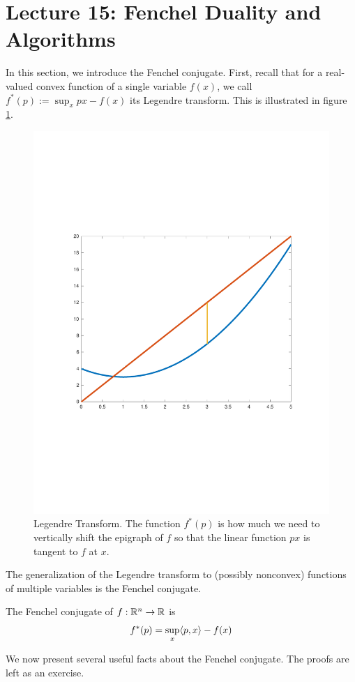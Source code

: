 \section{Lecture 15: Fenchel Duality and Algorithms}

In this section, we introduce the Fenchel conjugate. First, recall that for a real-valued convex function of a single variable $f(x)$, we call $f^*(p) := \sup_x px - f(x)$ its Legendre transform. This is illustrated in figure \ref{fig:leg-conj}.

\begin{figure}[h]
    \centering
    \includegraphics[width=.75\textwidth, trim = 0 200 0 200, clip]{figures/lecture15-conjugate.pdf}
    \caption{Legendre Transform. The function $f^*(p)$ is how much we need to vertically shift the epigraph of $f$ so that the linear function $px$ is tangent to $f$ at $x$.}
    \label{fig:leg-conj}
\end{figure}

The generalization of the Legendre transform to (possibly nonconvex) functions of multiple variables is the Fenchel conjugate.
\begin{definition}
The Fenchel conjugate of $f:\mathbb{R}^n \to \mathbb{R}$ is \[f^*(p) = \sup_x \langle p,x\rangle - f(x)\]
\end{definition}

We now present several useful facts about the Fenchel conjugate. The proofs are left as an exercise.

